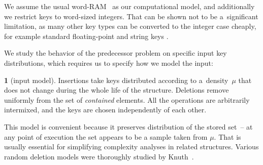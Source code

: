 \documentclass[
submission
]{dmtcs-episciences}
\theoremstyle{plain}
\theoremstyle{definition}
\newtheorem{defn}[thm]{\protect\definitionname}
\theoremstyle{remark}
\theoremstyle{plain}
\theoremstyle{plain}
\providecommand{\definitionname}{Definition}
\begin{document}
We assume the usual word-RAM~\cite{HagerupT98}
as our computational model, and additionally we restrict keys to word-sized
integers. That can be shown not to be a~significant limitation, as
many other key types can be converted to the integer case cheaply,
for example standard floating-point \cite[sec. 2.1.3]{Goldberg91}
and string keys \cite{AndersT01}.

We study the behavior of the predecessor problem on specific input
key distributions, which requires us to specify how we model the input:
\begin{defn}[input model]
Insertions take keys distributed according to a~density~$\mu$ that
does not change during the whole life of the structure. Deletions
remove uniformly from the set of \emph{contained} elements. All the
operations are arbitrarily intermixed, and the keys are chosen independently
of each other.
\end{defn}
This model is convenient because it preserves distribution of the
stored set~– at any point of execution the set appears to be a sample
taken from $\mu$. That is usually essential for simplifying complexity
analyses in related structures. Various random deletion models were
thoroughly studied by Knuth~\cite{Knuth77}.
\end{document}
